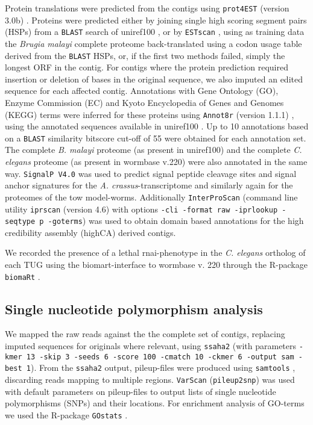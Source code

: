 Protein translations were predicted from the contigs using
\texttt{prot4EST} (version 3.0b)
\cite{wasmuth_prot4est:_2004}. Proteins were predicted either by
joining single high scoring segment pairs (HSPs) from a \texttt{BLAST}
search of uniref100 \cite{pmid18836194}, or by \texttt{ESTscan}
\cite{estscan}, using as training data the \textit{Brugia malayi}
complete proteome back-translated using a codon usage table derived
from the \texttt{BLAST} HSPs, or, if the first two methods failed,
simply the longest ORF in the contig. For contigs where the protein
prediction required insertion or deletion of bases in the original
sequence, we also imputed an edited sequence for each affected
contig. Annotations with Gene Ontology (GO), Enzyme Commission (EC)
and Kyoto Encyclopedia of Genes and Genomes (KEGG) terms were inferred
for these proteins using \texttt{Annot8r} (version 1.1.1)
\cite{schmid_annot8r:_2008}, using the annotated sequences available
in uniref100 \cite{pmid18836194}. Up to 10 annotations based on a
\texttt{BLAST} similarity bitscore cut-off of 55 were obtained for
each annotation set. The complete \textit{B. malayi} proteome (as
present in uniref100) and the complete \textit{C. elegans} proteome
(as present in wormbase v.220) were also annotated in the same
way. \texttt{SignalP V4.0} \cite{pmid21959131} was used to predict
signal peptide cleavage sites and signal anchor signatures for the
\textit{A. crassus}-transcriptome and similarly again for the
proteomes of the tow model-worms.  Additionally \texttt{InterProScan}
\cite{pmid11590104} (command line utility \texttt{iprscan} (version
4.6) with options \texttt{-cli -format raw -iprlookup -seqtype p
  -goterms}) was used to obtain domain based annotations for the high
credibility assembly (highCA) derived contigs.

We recorded the presence of a lethal rnai-phenotype in the
\textit{C. elegans} ortholog of each TUG using the biomart-interface
\cite{pmid22083790} to wormbase v. 220 through the R-package
\texttt{biomaRt} \cite{pmid19617889}.

\subsection*{Single nucleotide polymorphism analysis}

We mapped the raw reads against the the complete set of contigs,
replacing imputed sequences for originals where relevant, using
\texttt{ssaha2} \cite{pmid11591649} (with parameters \texttt{-kmer 13
  -skip 3 -seeds 6 -score 100 -cmatch 10 -ckmer 6 -output sam -best
  1}). From the \texttt{ssaha2} output, pileup-files were produced
using \texttt{samtools} \cite{journals/bioinformatics/LiHWFRHMAD09},
discarding reads mapping to multiple regions. \texttt{VarScan}
\cite{pmid19542151} (\texttt{pileup2snp}) was used with default
parameters on pileup-files to output lists of single nucleotide
polymorphisms (SNPs) and their locations. For enrichment analysis of
GO-terms we used the R-package \texttt{GOstats} \cite{pmid17098774}.

